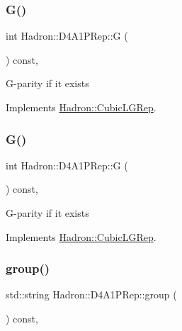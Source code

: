 \subsubsection{\texorpdfstring{G()}{G()}\hspace{0.1cm}{\footnotesize\ttfamily [2/3]}}
{\footnotesize\ttfamily int Hadron\+::\+D4\+A1\+P\+Rep\+::G (\begin{DoxyParamCaption}{ }\end{DoxyParamCaption}) const\hspace{0.3cm}{\ttfamily [inline]}, {\ttfamily [virtual]}}

G-\/parity if it exists 

Implements \mbox{\hyperlink{structHadron_1_1CubicLGRep_ace26f7b2d55e3a668a14cb9026da5231}{Hadron\+::\+Cubic\+L\+G\+Rep}}.

\mbox{\label{structHadron_1_1D4A1PRep_a51171e5c1f09171ff0bde566898e5780}} 
\subsubsection{\texorpdfstring{G()}{G()}\hspace{0.1cm}{\footnotesize\ttfamily [3/3]}}
{\footnotesize\ttfamily int Hadron\+::\+D4\+A1\+P\+Rep\+::G (\begin{DoxyParamCaption}{ }\end{DoxyParamCaption}) const\hspace{0.3cm}{\ttfamily [inline]}, {\ttfamily [virtual]}}

G-\/parity if it exists 

Implements \mbox{\hyperlink{structHadron_1_1CubicLGRep_ace26f7b2d55e3a668a14cb9026da5231}{Hadron\+::\+Cubic\+L\+G\+Rep}}.

\mbox{\label{structHadron_1_1D4A1PRep_aa8107b90fadc4874becba2ef3366e1b7}} 
\subsubsection{\texorpdfstring{group()}{group()}\hspace{0.1cm}{\footnotesize\ttfamily [1/3]}}
{\footnotesize\ttfamily std\+::string Hadron\+::\+D4\+A1\+P\+Rep\+::group (\begin{DoxyParamCaption}{ }\end{DoxyParamCaption}) const\hspace{0.3cm}{\ttfamily [inline]}, {\ttfamily [virtual]}}

